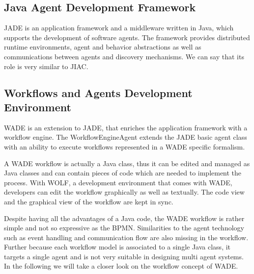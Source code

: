\subsection{Java Agent Development Framework}
JADE \cite{FBGCAPGR08, FBAPGR99} is an application framework and a middleware written in Java, which supports the development of software agents. The framework  provides distributed runtime environments, agent and behavior abstractions as well as communications between agents and discovery mechanisms. We can say that its role is very similar to JIAC.

\subsection{Workflows and Agents Development Environment}
WADE \cite{WEB} is an extension to JADE, that enriches the application framework with a workflow engine. The WorkflowEngineAgent extends the JADE basic agent class with an ability to execute workflows represented in a WADE specific formalism.

A WADE workflow is actually a Java class, thus it can be edited and managed as Java classes and can contain pieces of code which are needed to implement the process. With WOLF, a development environment that comes with WADE, developers can edit the workflow graphically as well as textually. The code view and the graphical view of the workflow are kept in sync.

Despite having all the advantages of a Java code, the WADE workflow is rather simple and not so expressive as the BPMN. Similarities to the agent technology such as event handling and communication flow are also missing in the workflow. Further because each workflow model is associated to a single Java class, it targets a single agent and is not very suitable in designing multi agent systems. In the following we will take a closer look on the workflow concept of WADE. 


